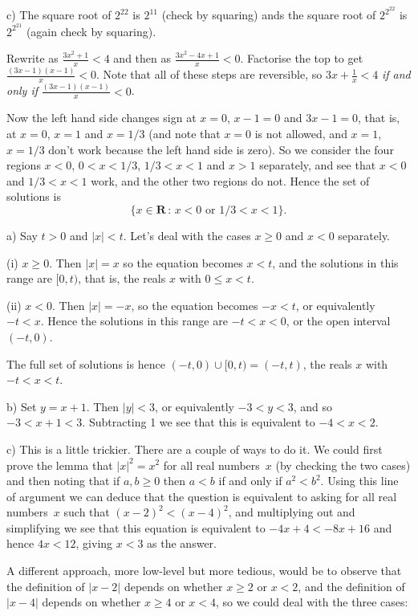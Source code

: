 \documentclass[10pt]{article}
\newcommand{\R}{\mathbf{R}}
\begin{document}
c) The square root of $2^{22}$ is $2^{11}$ (check by squaring) ands the square root of $2^{2^{22}}$ is $2^{2^{21}}$ (again check by squaring).

\medskip
{} Rewrite as $\frac{3x^2+1}{x}<4$ and then as $\frac{3x^2-4x+1}{x}<0$. Factorise the top to get $\frac{(3x-1)(x-1)}{x}<0$. Note that all of these steps are reversible, so $3x+\frac{1}{x}<4$ \emph{if and only if} $\frac{(3x-1)(x-1)}{x}<0$.

Now the left hand side changes sign at $x=0$, $x-1=0$ and $3x-1=0$, that is, at $x=0$, $x=1$ and $x=1/3$ (and note that $x=0$ is not allowed, and $x=1$, $x=1/3$ don't work because the left hand side is zero). So we consider the four regions $x<0$, $0<x<1/3$, $1/3<x<1$ and $x>1$ separately, and see that $x<0$ and $1/3<x<1$ work, and the other two regions do not. Hence the set of solutions is
$$\{x\in\R\,:\,x<0\mbox{ or }1/3<x<1\}.$$

\medskip
{} 

a) Say $t>0$ and $|x|<t$. Let's deal with the cases $x\geq0$ and $x<0$ separately.

(i) $x\geq0$. Then $|x|=x$ so the equation becomes $x<t$, and the solutions in this range are $[0,t)$, that is, the reals $x$ with $0\leq x<t$.

(ii) $x<0$. Then $|x|=-x$, so the equation becomes $-x<t$, or equivalently $-t<x$. Hence the solutions in this range are $-t<x<0$, or the open interval $(-t,0)$.

The full set of solutions is hence $(-t,0)\cup[0,t)=(-t,t)$, the reals $x$ with $-t<x<t$.

b) Set $y=x+1$. Then $|y|<3$, or equivalently $-3<y<3$, and so $-3<x+1<3$. Subtracting 1 we see that this is equivalent to $-4<x<2$.

c) This is a little trickier. There are a couple of ways to do it. We could first prove the lemma that $|x|^2=x^2$ for all real numbers~$x$ (by checking the two cases) and then noting that if $a,b\geq0$ then $a<b$ if and only if $a^2<b^2$. Using this line of argument we can deduce that the question is equivalent to asking for all real numbers~$x$ such that $(x-2)^2<(x-4)^2$, and multiplying out and simplifying we see that this equation is equivalent to $-4x+4<-8x+16$ and hence $4x<12$, giving $x<3$ as the answer.

A different approach, more low-level but more tedious, would be to observe that the definition of $|x-2|$ depends on whether $x\geq2$ or $x<2$, and the definition of $|x-4|$ depends on whether $x\geq4$ or $x<4$, so we could deal with the three cases:
\end{document}
